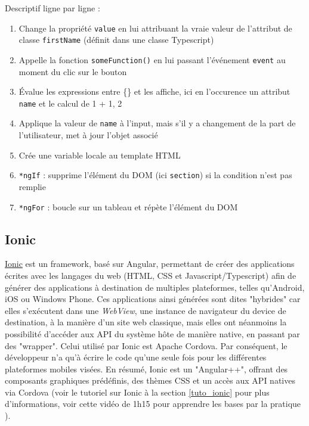 \documentclass[a4paper, 12pt]{article}
\begin{document}
\bigbreak
Descriptif ligne par ligne :
\begin{enumerate}
    \item Change la propriété \texttt{value} en lui attribuant la vraie valeur de l'attribut de classe \texttt{firstName} (définit dans une classe Typescript)
    \item Appelle la fonction \texttt{someFunction()} en lui passant l'événement \texttt{event} au moment du clic sur le bouton
    \item Évalue les expressions entre \{\} et les affiche, ici en l'occurence un attribut \texttt{name} et le calcul de 1 + 1, 2
    \item Applique la valeur de \texttt{name} à l'input, mais s'il y a changement de la part de l'utilisateur, met à jour l'objet associé
    \item Crée une variable locale au template HTML
    \item \texttt{*ngIf} : supprime l'élément du DOM (ici \texttt{section}) si la condition n'est pas remplie
    \item \texttt{*ngFor} : boucle sur un tableau et répète l'élément du DOM
\end{enumerate}

\subsection{Ionic}
\href{https://ionicframework.com/}{Ionic} est un framework, basé sur Angular, permettant de créer des applications écrites avec les langages du web (HTML, CSS et
Javascript/Typescript) afin de générer des applications à destination de multiples plateformes, telles qu'Android,
iOS ou Windows Phone. Ces applications ainsi générées sont dites "hybrides" car elles s'exécutent dans une
\textit{WebView}, une instance de navigateur du device de destination, à la manière d'un site web classique, mais
elles ont néanmoins la possibilité d'accéder aux API du système hôte de manière native, en passant par des "wrapper".
Celui utilisé par Ionic est Apache Cordova. Par conséquent, le développeur n'a qu'à écrire le code qu'une seule fois
pour les différentes plateformes mobiles visées. En résumé, Ionic est un "Angular++", offrant des composants graphiques
prédéfinis, des thèmes CSS et un accès aux API natives via Cordova
(voir le tutoriel sur Ionic à la section \ref{tuto_ionic} pour plus d'informations, voir cette vidéo de 1h15 pour
apprendre les bases par la pratique \cite{ref18}).
\end{document}
